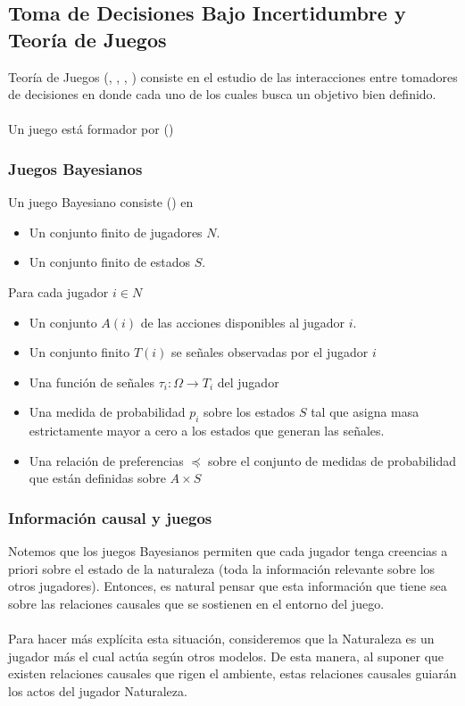 \documentclass[11pt]{article}
\theoremstyle{plain}
\begin{document}
\subsection{Toma de Decisiones Bajo Incertidumbre y Teoría de Juegos}
Teoría de Juegos (\cite{von1944theory}, \cite{osborne1994course}, \cite{webb2007game}, \cite{gintis2014bounds}) consiste en el estudio de las interacciones entre tomadores de decisiones en donde cada uno de los cuales busca un objetivo bien definido. \\
\\
Un juego está formador por (\cite{osborne1994course})

\subsubsection{Juegos Bayesianos}
Un juego Bayesiano consiste (\cite{osborne1994course}) en 
\begin{itemize}
\item Un conjunto finito de jugadores $N$.
\item Un conjunto finito de estados $S$.
\end{itemize}
Para cada jugador $i \in N$
\begin{itemize}
\item Un conjunto $A(i)$ de las acciones disponibles al jugador $i$.
\item Un conjunto finito $T(i)$ se señales observadas por el jugador $i$
\item Una función de señales $\tau_i : \Omega \to T_i$ del jugador
\item Una medida de probabilidad $p_i$ sobre los estados $S$ tal que asigna masa estrictamente mayor a cero a los estados que generan las 
señales.
\item Una relación de preferencias $\preceq$ sobre el conjunto de medidas de probabilidad que están definidas sobre $A \times S$
\end{itemize}
\subsubsection{Información causal y juegos}
Notemos que los juegos Bayesianos permiten que cada jugador tenga creencias a priori sobre el estado de la naturaleza (toda la información relevante sobre los otros jugadores). Entonces, es natural pensar que esta información que tiene sea sobre las relaciones causales que se sostienen en el entorno del juego.\\
\\
Para hacer más explícita esta situación, consideremos que la Naturaleza es un jugador más el cual actúa según otros modelos. De esta manera, al suponer que existen relaciones causales que rigen el ambiente, estas relaciones causales guiarán los actos del jugador Naturaleza.\\
\end{document}
